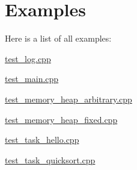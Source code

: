 \section{Examples}
Here is a list of all examples\-:\begin{DoxyCompactItemize}
\item 
\hyperlink{test_log_8cpp-example}{test\-\_\-log.\-cpp}
\item 
\hyperlink{test_main_8cpp-example}{test\-\_\-main.\-cpp}
\item 
\hyperlink{test_memory_heap_arbitrary_8cpp-example}{test\-\_\-memory\-\_\-heap\-\_\-arbitrary.\-cpp}
\item 
\hyperlink{test_memory_heap_fixed_8cpp-example}{test\-\_\-memory\-\_\-heap\-\_\-fixed.\-cpp}
\item 
\hyperlink{test_task_hello_8cpp-example}{test\-\_\-task\-\_\-hello.\-cpp}
\item 
\hyperlink{test_task_quicksort_8cpp-example}{test\-\_\-task\-\_\-quicksort.\-cpp}
\end{DoxyCompactItemize}
